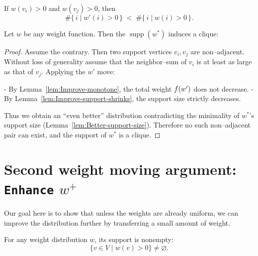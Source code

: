 \begin{lemma}\label{lem:Improve-support-shrinks}

If $w(v_i)>0$ and $w(v_j)>0$, then
\[
  \#\{\,i\mid w'(i)>0\,\}
  \;<\;
  \#\{\,i\mid w(i)>0\,\}.
\]
\leanok
{}
\end{lemma}

\begin{lemma}\label{lem:Better-forms-clique}
Let $w$ be any weight function.  
Then the $\operatorname{supp}(w^*)$ induces a clique:

\leanok
{}
\end{lemma}

\begin{proof}
Assume the contrary. Then two support vertices $v_i,v_j$ are non–adjacent.  
Without loss of generality assume that the neighbor–sum of $v_i$ is at least as large as that of $v_j$. Applying the $w'$ move:

- By Lemma~\ref{lem:Improve-monotone}, the total weight $f(w')$ does not decrease.
- By Lemma~\ref{lem:Improve-support-shrinks}, the support size strictly decreases.

Thus we obtain an ``even better'' distribution contradicting the minimality of 
$w^*$’s support size (Lemma~\ref{lem:Better-support-size}).  
Therefore no such non–adjacent pair can exist, and the support of $w^*$ is a clique.
\end{proof}

\section{Second weight moving argument: \texttt{Enhance} \(w^+\)}
\label{sec:second_weight_moving}

Our goal here is to show that unless the weights are already
uniform, we can improve the distribution further by transferring a small
amount of weight.

\begin{lemma}\label{lem:support-size-nonempty}
\leanok
\uses{}
For any weight distribution $w$, its support is nonempty:
\[
  \{ v \in V \mid w(v) > 0 \} \neq \varnothing.
\]
\end{lemma}

